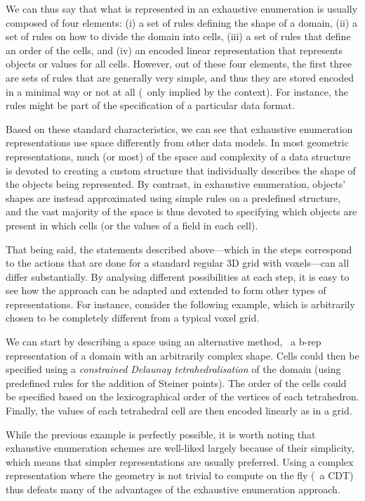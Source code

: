 We can thus say that what is represented in an exhaustive enumeration is usually composed of four elements: (i) a set of rules defining the shape of a domain, (ii) a set of rules on how to divide the domain into cells, (iii) a set of rules that define an order of the cells, and (iv) an encoded linear representation that represents objects or values for all cells.
However, out of these four elements, the first three are sets of rules that are generally very simple, and thus they are stored encoded in a minimal way or not at all (\ie\ only implied by the context).
For instance, the rules might be part of the specification of a particular data format.

Based on these standard characteristics, we can see that exhaustive enumeration representations use space differently from other data models.
In most geometric representations, much (or most) of the space and complexity of a data structure is devoted to creating a custom structure that individually describes the shape of the objects being represented.
By contrast, in exhaustive enumeration, objects' shapes are instead approximated using simple rules on a predefined structure, and the vast majority of the space is thus devoted to specifying which objects are present in which cells (or the values of a field in each cell).

That being said, the statements described above---which in the steps correspond to the actions that are done for a standard regular 3D grid with voxels---can all differ substantially.
By analysing different possibilities at each step, it is easy to see how the approach can be adapted and extended to form other types of representations.
For instance, consider the following example, which is arbitrarily chosen to be completely different from a typical voxel grid.

We can start by describing a space using an alternative method, \eg\ a b-rep representation of a domain with an arbitrarily complex shape.
Cells could then be specified using a \emph{constrained Delaunay tetrahedralisation} of the domain (using predefined rules for the addition of Steiner points).
The order of the cells could be specified based on the lexicographical order of the vertices of each tetrahedron.
Finally, the values of each tetrahedral cell are then encoded linearly as in a grid.

While the previous example is perfectly possible, it is worth noting that exhaustive enumeration schemes are well-liked largely because of their simplicity, which means that simpler representations are usually preferred.
Using a complex representation where the geometry is not trivial to compute on the fly (\eg\ a CDT) thus defeats many of the advantages of the exhaustive enumeration approach.

